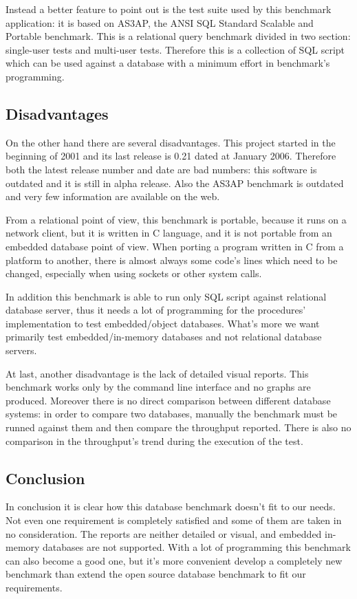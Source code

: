 Instead a better feature to point out is the test suite used by this benchmark application: it is based on AS3AP, the ANSI SQL Standard Scalable and Portable benchmark. This is a relational query benchmark divided in two section: single-user tests and multi-user tests. Therefore this is a collection of SQL script which can be used against a database with a minimum effort in benchmark's programming. 

		\subsection{Disadvantages}
On the other hand there are several disadvantages. This project started in the beginning of 2001 and its last release is 0.21 dated at January 2006. Therefore both the latest release number and date are bad numbers: this software is outdated and it is still in alpha release. Also the AS3AP benchmark is outdated and very few information are available on the web.

From a relational point of view, this benchmark is portable, because it runs on a network client, but it is written in C language, and it is not portable from an embedded database point of view. When porting a program written in C from a platform to another, there is almost always some code's lines which need to be changed, especially when using sockets or other system calls.

In addition this benchmark is able to run only SQL script against relational database server, thus it needs a lot of programming for the procedures' implementation to test embedded/object databases. What's more we want primarily test embedded/in-memory databases and not relational database servers.

At last, another disadvantage is the lack of detailed visual reports. This benchmark works only by the command line interface and no graphs are produced. Moreover there is no direct comparison between different database systems: in order to compare two databases, manually the benchmark must be runned against them and then compare the throughput reported. There is also no comparison in the throughput's trend during the execution of the test.

		\subsection{Conclusion}
In conclusion it is clear how this database benchmark doesn't fit to our needs. Not even one requirement is completely satisfied and some of them are taken in no consideration. The reports are neither detailed or visual, and embedded in-memory databases are not supported. With a lot of programming this benchmark can also become a good one, but it's more convenient develop a completely new benchmark than extend the open source database benchmark to fit our requirements.

